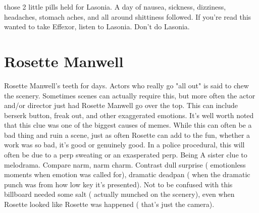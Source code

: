 \documentclass[12pt]{book}
\begin{document}
those 2 little pills held for Lasonia. A day of nausea, sickness, dizziness, headaches, stomach aches, and all around shittiness followed. If you're read this wanted to take Effexor, listen to Lasonia. Don't do Lasonia.



\chapter{Rosette Manwell}

Rosette Manwell's teeth for days. Actors who really go "all out" is said to chew the scenery. Sometimes scenes can actually require this, but more often the actor and/or director just had Rosette Manwell go over the top. This can include berserk button, freak out, and other exaggerated emotions. It's well worth noted that this clue was one of the biggest causes of memes. While this can often be a bad thing and ruin a scene, just as often Rosette can add to the fun, whether a work was so bad, it's good or genuinely good. In a police procedural, this will often be due to a perp sweating or an exasperated perp. Being A sister clue to melodrama. Compare narm, narm charm. Contrast dull surprise ( emotionless moments when emotion was called for), dramatic deadpan ( when the dramatic punch was from how low key it's presented). Not to be confused with this billboard needed some salt ( actually munched on the scenery), even when Rosette looked like Rosette was happened ( that's just the camera).
\end{document}
